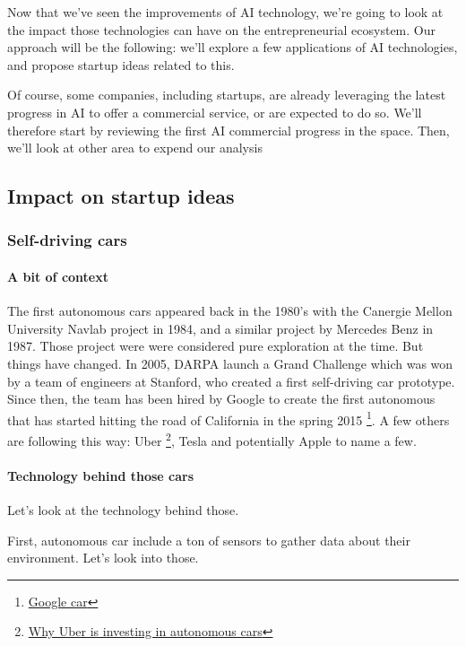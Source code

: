 \documentclass[12pt]{article}
\begin{document}
Now that we've seen the improvements of AI technology, we're going to look at
the impact those technologies can have on the entrepreneurial ecosystem.
Our approach will be the following: we'll explore a few applications of AI
technologies, and propose startup ideas related to this.

Of course, some companies, including startups, are already leveraging the latest
progress in AI to offer a commercial service, or are expected to do so.
We'll therefore start by reviewing the first AI commercial progress in the
space. Then, we'll look at other area to expend our analysis

\subsection{Impact on startup ideas}

\subsubsection{Self-driving cars}

\paragraph{A bit of context}

The first autonomous cars appeared back in the 1980's with the Canergie Mellon
University Navlab project in 1984, and a similar project by Mercedes Benz in
1987. Those project were were considered pure exploration at the time.
But things have changed. In 2005, DARPA launch a Grand Challenge which was won
by a team of engineers at Stanford, who created a first self-driving car
prototype. Since then, the team has been hired by Google to create the first
autonomous that has started hitting the road of California in the spring 2015 \footnote{\href{http://www.google.com/selfdrivingcar/}
{Google car}}.
A few others are following this way: Uber \footnote{\href{http://www.businessinsider.com/why-uber-is-investing-in-autonomous-cars-2015-8?IR=T}
{Why Uber is investing in autonomous cars}}, Tesla and potentially Apple to name
a few.

\paragraph{Technology behind those cars}

Let's look at the technology behind those.

First, autonomous car include a ton of sensors to gather data about their
environment. Let's look into those.
\end{document}
